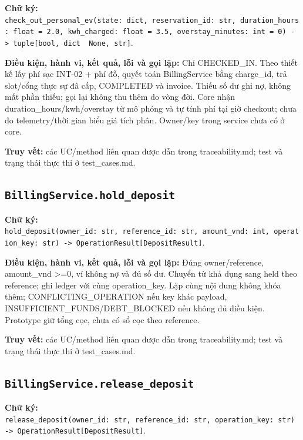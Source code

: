\documentclass[11pt,a4paper]{article}
\begin{document}
\textbf{Chữ ký:}
\texttt{check\_out\_personal\_ev(state:\ dict,\ reservation\_id:\ str,\ duration\_hours:\ float\ =\ 2.0,\ kwh\_charged:\ float\ =\ 3.5,\ overstay\_minutes:\ int\ =\ 0)\ -\textgreater{}\ tuple{[}bool,\ dict\ \textbar{}\ None,\ str{]}}.

\textbf{Điều kiện, hành vi, kết quả, lỗi và gọi lặp:} Chỉ CHECKED\_IN.
Theo thiết kế lấy phí sạc INT-02 + phí đỗ, quyết toán BillingService
bằng charge\_id, trả slot/cổng thực sự đã cấp, COMPLETED và invoice.
Thiếu số dư ghi nợ, không mất phần thiếu; gọi lại không thu thêm do vòng
đời. Core nhận duration\_hours/kwh/overstay từ mô phỏng và tự tính phí
tại giờ checkout; chưa đo telemetry/thời gian biểu giá tích phân.
Owner/key trong service chưa có ở core.

\textbf{Truy vết:} các UC/method liên quan được dẫn trong
traceability.md; test và trạng thái thực thi ở test\_cases.md.

\hypertarget{billingservice.hold_deposit}{%
\subsection{\texorpdfstring{\texttt{BillingService.hold\_deposit}}{BillingService.hold\_deposit}}\label{billingservice.hold_deposit}}

\textbf{Chữ ký:}
\texttt{hold\_deposit(owner\_id:\ str,\ reference\_id:\ str,\ amount\_vnd:\ int,\ operation\_key:\ str)\ -\textgreater{}\ OperationResult{[}DepositResult{]}}.

\textbf{Điều kiện, hành vi, kết quả, lỗi và gọi lặp:} Đúng
owner/reference, amount\_vnd \textgreater=0, ví không nợ và đủ số dư.
Chuyển từ khả dụng sang held theo reference; ghi ledger với cùng
operation\_key. Lặp cùng nội dung không khóa thêm;
CONFLICTING\_OPERATION nếu key khác payload,
INSUFFICIENT\_FUNDS/DEBT\_BLOCKED nếu không đủ điều kiện. Prototype giữ
tổng cọc, chưa có sổ cọc theo reference.

\textbf{Truy vết:} các UC/method liên quan được dẫn trong
traceability.md; test và trạng thái thực thi ở test\_cases.md.

\hypertarget{billingservice.release_deposit}{%
\subsection{\texorpdfstring{\texttt{BillingService.release\_deposit}}{BillingService.release\_deposit}}\label{billingservice.release_deposit}}

\textbf{Chữ ký:}
\texttt{release\_deposit(owner\_id:\ str,\ reference\_id:\ str,\ operation\_key:\ str)\ -\textgreater{}\ OperationResult{[}DepositResult{]}}.
\end{document}
